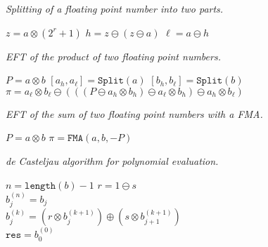 \documentclass[letterpaper,10pt]{article}
\begin{document}
\begin{algorithm}[H]
  \caption{\textit{Splitting of a floating point number into two parts.}}

  \begin{algorithmic}
      \State \(z = a \otimes (2^r + 1)\)
      \State \(h = z \ominus (z \ominus a)\)
      \State \(\ell = a \ominus h\)
    \EndFunction
  \end{algorithmic}
\end{algorithm}

\begin{algorithm}[H]
  \caption{\textit{EFT of the product of two floating point numbers.}}

  \begin{algorithmic}
      \State \(P = a \otimes b\)
      \State \(\left[a_h, a_{\ell}\right] = \mathtt{Split}(a)\)
      \State \(\left[b_h, b_{\ell}\right] = \mathtt{Split}(b)\)
      \State \(\pi = a_{\ell} \otimes b_{\ell} \ominus (((P \ominus
          a_h \otimes b_h)
          \ominus a_{\ell} \otimes b_h) \ominus a_h \otimes b_{\ell})\)
    \EndFunction
  \end{algorithmic}
\end{algorithm}

\begin{algorithm}[H]
  \caption{\textit{EFT of the sum of two floating point numbers with a FMA.}}

  \begin{algorithmic}
      \State \(P = a \otimes b\)
      \State \(\pi = \mathtt{FMA}(a, b, -P)\)
    \EndFunction
  \end{algorithmic}
\end{algorithm}

\begin{algorithm}[H]
  \caption{\textit{de Casteljau algorithm for polynomial evaluation.}}

  \begin{algorithmic}
      \State \(n = \texttt{length}(b) - 1\)
      \State \(r = 1 \ominus s\)
      \\
        \State \(b_j^{(n)} = b_j\)
      \EndFor
      \\
          \State \(b_j^{(k)} = \left(r \otimes b_j^{(k + 1)}\right) \oplus
              \left(s \otimes b_{j + 1}^{(k + 1)}\right)\)
        \EndFor
      \EndFor
      \\
      \State \(\mathtt{res} = b_0^{(0)}\)
    \EndFunction
  \end{algorithmic}
\end{algorithm}
\end{document}
